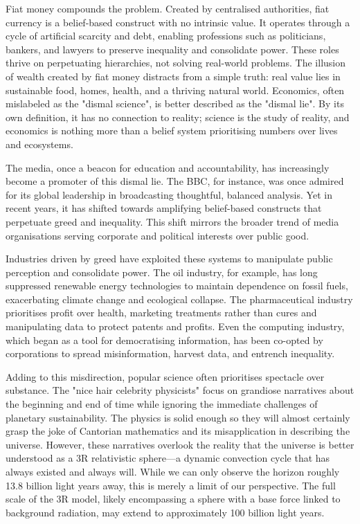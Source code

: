 \documentclass[12pt]{article}
\begin{document}
Fiat money compounds the problem. Created by centralised authorities, fiat currency is a belief-based construct with no intrinsic value. It operates through a cycle of artificial scarcity and debt, enabling professions such as politicians, bankers, and lawyers to preserve inequality and consolidate power. These roles thrive on perpetuating hierarchies, not solving real-world problems. The illusion of wealth created by fiat money distracts from a simple truth: real value lies in sustainable food, homes, health, and a thriving natural world. Economics, often mislabeled as the "dismal science", is better described as the "dismal lie". By its own definition, it has no connection to reality; science is the study of reality, and economics is nothing more than a belief system prioritising numbers over lives and ecosystems.

The media, once a beacon for education and accountability, has increasingly become a promoter of this dismal lie. The BBC, for instance, was once admired for its global leadership in broadcasting thoughtful, balanced analysis. Yet in recent years, it has shifted towards amplifying belief-based constructs that perpetuate greed and inequality. This shift mirrors the broader trend of media organisations serving corporate and political interests over public good.

Industries driven by greed have exploited these systems to manipulate public perception and consolidate power. The oil industry, for example, has long suppressed renewable energy technologies to maintain dependence on fossil fuels, exacerbating climate change and ecological collapse. The pharmaceutical industry prioritises profit over health, marketing treatments rather than cures and manipulating data to protect patents and profits. Even the computing industry, which began as a tool for democratising information, has been co-opted by corporations to spread misinformation, harvest data, and entrench inequality.

Adding to this misdirection, popular science often prioritises spectacle over substance. The "nice hair celebrity physicists" focus on grandiose narratives about the beginning and end of time while ignoring the immediate challenges of planetary sustainability. The physics is solid enough so they will almost certainly grasp the joke of Cantorian mathematics and its misapplication in describing the universe. However, these narratives overlook the reality that the universe is better understood as a 3R relativistic sphere—a dynamic convection cycle that has always existed and always will. While we can only observe the horizon roughly 13.8 billion light years away, this is merely a limit of our perspective. The full scale of the 3R model, likely encompassing a sphere with a base force linked to background radiation, may extend to approximately 100 billion light years. 
\end{document}
